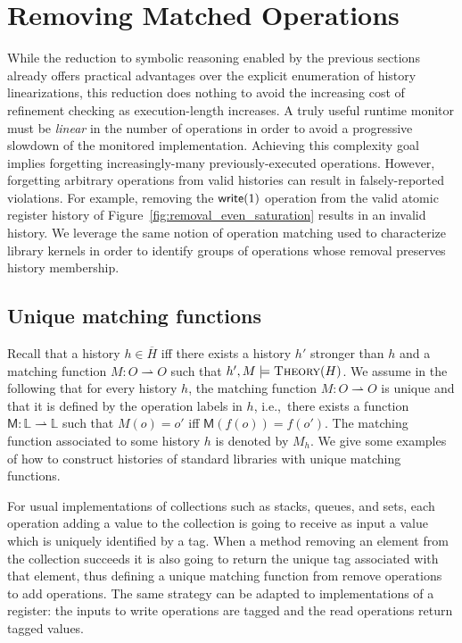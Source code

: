 \section{Removing Matched Operations}
\label{sec:obsolete}

While the reduction to symbolic reasoning enabled by the previous sections
already offers practical advantages over the explicit enumeration of history
linearizations, this reduction does nothing to avoid the increasing cost of
refinement checking as execution-length increases. A truly useful runtime
monitor must be \emph{linear} in the number of operations in order to avoid a
progressive slowdown of the monitored implementation. Achieving this complexity
goal implies forgetting increasingly-many previously-executed operations.
However, forgetting arbitrary operations from valid histories can result in
falsely-reported violations. For example, removing the ${\sf write}(1)$
operation from the valid atomic register history of
Figure~\ref{fig:removal_even_saturation} results in an invalid history. We
leverage the same notion of operation matching used to characterize library
kernels in order to identify groups of operations whose removal preserves
history membership.

\subsection{Unique matching functions}

Recall that a history $h\in \overline{H}$ iff there exists a history $h'$
stronger than $h$ and a matching function $M : O \rightharpoonup O$ such that
$h',M\models \textsc{Theory}(H)$. We assume in the following that for every
history $h$, the matching function $M : O \rightharpoonup O$ is unique and that
it is defined by the operation labels in $h$, i.e.,~there exists a function
$\mathsf{M}:\mathbb{L} \rightharpoonup \mathbb{L}$ such that $M(o)=o'$ iff
$\mathsf{M}(f(o))=f(o')$. The matching function associated to some history $h$
is denoted by $M_h$. We give some examples of how to construct histories of
standard libraries with unique matching functions.

\begin{example}[Collections]

  For usual implementations of collections such as stacks, queues, and sets,
  each operation adding a value to the collection is going to receive as input
  a value which is uniquely identified by a tag. When a method removing an
  element from the collection succeeds it is also going to return the unique
  tag associated with that element, thus defining a unique matching function
  from remove operations to add operations. The same strategy can be adapted to
  implementations of a register: the inputs to write operations are tagged and
  the read operations return tagged values.

\end{example}

